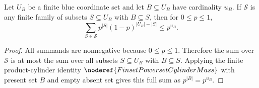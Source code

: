 \begin{helper}
Let \(U_B\) be a finite blue coordinate set and let \(B\subseteq U_B\) have
cardinality \(u_B\).  If \(\mathcal S\) is any finite family of subsets
\(S\subseteq U_B\) with \(B\subseteq S\), then for \(0\le p\le 1\),
\[
\sum_{S\in\mathcal S}p^{|S|}(1-p)^{|U_B|-|S|}
\le p^{u_B}.
\]
\end{helper}
\begin{proof}
All summands are nonnegative because \(0\le p\le 1\).  Therefore the sum over
\(\mathcal S\) is at most the sum over all subsets \(S\subseteq U_B\) with
\(B\subseteq S\).  Applying the finite product-cylinder identity
\(\noderef{FinsetPowersetCylinderMass}\) with present set \(B\) and empty
absent set gives this full sum as \(p^{|B|}=p^{u_B}\).
\end{proof}
